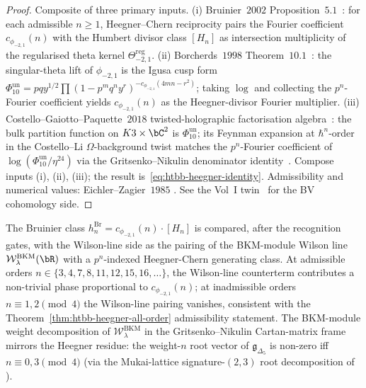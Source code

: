 \begin{proof}
Composite of three primary inputs. (i) Bruinier~$2002$
Proposition~$5.1$~\cite{Bruinier2002}: for each admissible $n\geq 1$,
Heegner--Chern reciprocity pairs the Fourier coefficient
$c_{\phi_{-2,1}}(n)$ with the Humbert divisor class $[H_n]$ as
intersection multiplicity of the regularised theta kernel
$\Theta^{\mathrm{reg}}_{-2,1}$. (ii) Borcherds~$1998$
Theorem~$10.1$~\cite{Borcherds1998}: the singular-theta lift of
$\phi_{-2,1}$ is the Igusa cusp form
$\Phi_{10}^{\mathrm{un}} = pqy^{1/2}\prod(1-p^mq^ny^r)^{-c_{\phi_{-2,1}}(4mn-r^2)}$;
taking $\log$ and collecting the $p^n$-Fourier coefficient yields
$c_{\phi_{-2,1}}(n)$ as the Heegner-divisor Fourier multiplier.
(iii) Costello--Gaiotto--Paquette~$2018$ twisted-holographic
factorisation algebra~\cite{CostelloGaiottoPaquette2018}: the bulk
partition function on $K3\times\bC^2$ is $\Phi_{10}^{\mathrm{un}}$; its Feynman
expansion at $\hbar^n$-order in the Costello--Li $\Omega$-background
twist \cite[\S 3]{CostelloLi2016} matches the $p^n$-Fourier coefficient
of $\log(\Phi_{10}^{\mathrm{un}}/\eta^{24})$ via the Gritsenko--Nikulin denominator
identity~\cite[Thm.~2.1]{GritsenkoNikulin1998}. Compose inputs (i),
(ii), (iii); the result is~\eqref{eq:htbb-heegner-identity}.
Admissibility and numerical values: Eichler--Zagier~$1985$
\cite[Theorem 9.3, Table 1]{EichlerZagier1985}. See the Vol~I
twin~\cite[Theorem~\ref*{V1-thm:bvbrst-heegner-all-order}]{Lorgat1}
for the BV cohomology side.
\end{proof}

\begin{remark}
\label{rem:htbb-heegner-line-defect-decomp}
The Bruinier class $h_n^{\mathrm{Br}} =
c_{\phi_{-2,1}}(n)\cdot[H_n]$ is compared, after the recognition gates,
with the Wilson-line side as the pairing of the BKM-module Wilson line
$\mathcal{W}^{\mathrm{BKM}}_\lambda(\bR)$ with a $p^n$-indexed
Heegner-Chern generating class. At admissible orders
$n\in\{3, 4, 7, 8, 11, 12, 15, 16, \ldots\}$, the Wilson-line
counterterm contributes a non-trivial phase proportional to
$c_{\phi_{-2,1}}(n)$; at inadmissible orders $n\equiv 1, 2\pmod 4$ the
Wilson-line pairing vanishes, consistent with the
Theorem~\ref{thm:htbb-heegner-all-order} admissibility statement.
The BKM-module weight decomposition of
$\mathcal{W}^{\mathrm{BKM}}_\lambda$ in the Gritsenko--Nikulin
Cartan-matrix frame mirrors the Heegner residue: the weight-$n$ root
vector of $\mathfrak{g}_{\Delta_5}$ is non-zero iff $n\equiv 0, 3\pmod
4$ (via the Mukai-lattice signature-$(2, 3)$ root decomposition of
\cite[\S 3]{GritsenkoNikulin1997}).
\end{remark}

